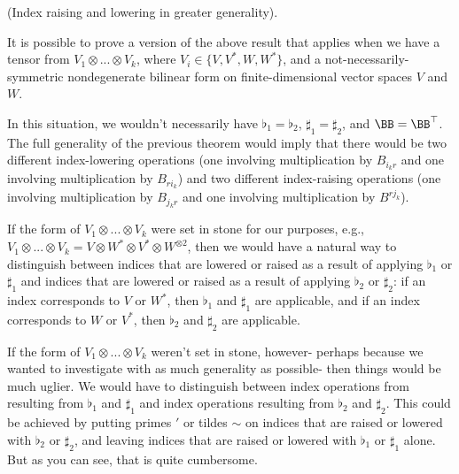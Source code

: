 \begin{remark}
    (Index raising and lowering in greater generality).

    It is possible to prove a version of the above result that applies when we have a tensor from $V_1 \otimes ... \otimes V_k$, where ${V_i \in \{V, V^*, W, W^*\}}$, and a not-necessarily-symmetric nondegenerate bilinear form on finite-dimensional vector spaces $V$ and $W$.
    
    In this situation, we wouldn't necessarily have $\flat_1 = \flat_2$, $\sharp_1 = \sharp_2$, and $\BB = \BB^\top$. The full generality of the previous theorem would imply that there would be two different index-lowering operations (one involving multiplication by $B_{i_k r}$ and one involving multiplication by $B_{r i_k}$) and two different index-raising operations (one involving multiplication by $B_{j_k r}$ and one involving multiplication by $B^{r j_k}$).
    
    If the form of $V_1 \otimes ... \otimes V_k$ were set in stone for our purposes, e.g., $V_1 \otimes ... \otimes V_k = V \otimes W^* \otimes V^* \otimes W^{\otimes 2}$, then we would have a natural way to distinguish between indices that are lowered or raised as a result of applying $\flat_1$ or $\sharp_1$ and indices that are lowered or raised as a result of applying $\flat_2$ or $\sharp_2$: if an index corresponds to $V$ or $W^*$, then $\flat_1$ and $\sharp_1$ are applicable, and if an index corresponds to $W$ or $V^*$, then $\flat_2$ and $\sharp_2$ are applicable.

    If the form of $V_1 \otimes ... \otimes V_k$ weren't set in stone, however- perhaps because we wanted to investigate with as much generality as possible- then things would be much uglier. We would have to distinguish between index operations from resulting from $\flat_1$ and $\sharp_1$ and index operations resulting from $\flat_2$ and $\sharp_2$.    This could be achieved by putting primes $'$ or tildes $\sim$ on indices that are raised or lowered with $\flat_2$ or $\sharp_2$, and leaving indices that are raised or lowered with $\flat_1$ or $\sharp_1$ alone. But as you can see, that is quite cumbersome.




\end{remark}
